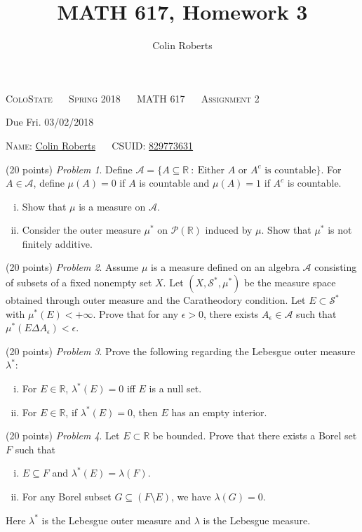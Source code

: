 \documentclass[leqno]{article}
\author{Colin Roberts}
\title{MATH 617, Homework 3}
\theoremstyle{nonumberplain}
\newcommand{\R}{\mathbb{R}}
\begin{document}
\begin{center}
  \textsc{\large ColoState ~~ Spring 2018 ~~ MATH 617 ~~ Assignment 2}
\end{center}

\begin{center}
  \textrm{Due Fri. 03/02/2018}
\end{center}

\vglue 0.10in

\bigskip
\noindent
\textsc{Name:} \underline{Colin Roberts\hglue 1.5in} ~~
\textsc{CSUID:} \underline{829773631\hglue 1.5in}

\vskip 0.15in

\bigskip
\noindent
(20 points) \textit{Problem 1}. \quad
Define $\mathcal{A}=\{A\subseteq \R ~\colon~ \textrm{Either $A$ or $A^c$ is countable}\}$. For $A\in \mathcal{A}$, define $\mu(A)=0$ if $A$ is countable and $\mu(A)=1$ if $A^c$ is countable.
\begin{enumerate}[(i)]
\item Show that $\mu$ is a measure on $\mathcal{A}$.
\item Consider the outer measure $\mu^*$ on $\mathcal{P}(\R)$ induced by $\mu$. Show that $\mu^*$ is not finitely additive.
\end{enumerate}

\bigskip
\bigskip
\noindent
(20 points) \textit{Problem 2}. \quad
Assume $\mu$ is a measure defined on an algebra $\mathcal{A}$ consisting of subsets of a fixed nonempty set $X$. Let $(X,\mathcal{S}^*,\mu^*)$ be the measure space obtained through outer measure and the Caratheodory condition. Let $E\subset \mathcal{S}^*$ with $\mu^*(E)<+\infty$. Prove that for any $\epsilon>0$, there exists $A_\epsilon \in \mathcal{A}$ such that $\mu^*(E\Delta A_\epsilon)<\epsilon$.

\bigskip
\bigskip
\noindent
(20 points) \textit{Problem 3}. \quad
Prove the following regarding the Lebesgue outer measure $\lambda^*$:
\begin{enumerate}[(i)]
\item For $E\in \R$, $\lambda^*(E)=0$ iff $E$ is a null set.
\item For $E\in \R$, if $\lambda^*(E)=0$, then $E$ has an empty interior.
\end{enumerate}

\bigskip
\bigskip
\noindent
(20 points) \textit{Problem 4}. \quad
Let $E\subset \R$ be bounded. Prove that there exists a Borel set $F$ such that 
\begin{enumerate}[(i)]
\item $E\subseteq F$ and $\lambda^*(E)=\lambda(F)$.
\item For any Borel subset $G\subseteq (F\setminus E)$, we have $\lambda(G)=0$.
\end{enumerate}
Here $\lambda^*$ is the Lebesgue outer measure and $\lambda$ is the Lebesgue measure.
\end{document}
